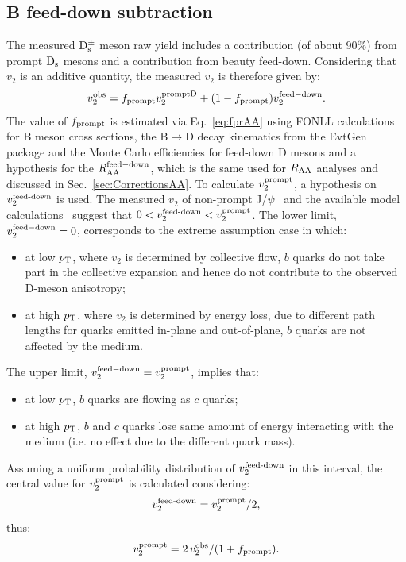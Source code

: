 \subsection{B feed-down subtraction}
\label{sec:FDv2}
The measured ${\rm D_s^{\pm}}$ meson raw yield includes a contribution (of about 90\%)
from prompt ${\rm D_s}$ mesons and a contribution from beauty feed-down.
Considering that $v_2$ is an additive quantity, the measured $v_2$ is therefore given by:
\begin{equation}
\label{eq:bfeed}
v_2^{\rm obs}=f_{\rm prompt} v_2^{\rm promptD} + (1-f_{\rm prompt})v_2^{\rm feed-down}.
\end{equation}
The value of $f_{\rm prompt}$ is estimated via Eq.~\ref{eq:fprAA} using FONLL calculations for B meson
cross sections, the B$\rightarrow$D decay kinematics from the EvtGen package and
the Monte Carlo efficiencies for feed-down D mesons and a
hypothesis for the $R_{\rm AA}^{\rm feed-down}$, which is the same used for
$R_{\rm AA}$ analyses and discussed in Sec.~\ref{sec:CorrectionsAA}.
To calculate $v_{\rm 2}^{\rm prompt}$, a hypothesis on 
$v_{\rm 2}^{\rm feed\textnormal{-}down}$ is used.
The measured $v_2$ of non-prompt J/$\psi$~\cite{Khachatryan:2016ypw} 
and the available model calculations~\cite{Aichelin:2012ww,Uphoff:2012gb,Greco:2007sz} 
suggest that $0<v_{\rm 2}^{\rm feed\textnormal{-}down}<v_{\rm 2}^{\rm prompt}$.
The lower limit, $v_2^{\rm feed-down}=0$, corresponds to the extreme assumption case in which:
\begin{itemize}
\item{at low $p_{\rm T}$, where $v_2$ is determined by collective flow, 
$b$ quarks do not take part in the collective expansion and hence do 
not contribute to the observed D-meson anisotropy;}
\item{at high $p_{\rm T}$, where $v_2$ is determined by 
energy loss, due to different path lengths for quarks emitted in-plane and out-of-plane,
$b$ quarks are not affected by the medium.}
\end{itemize}
The upper limit, $v_2^{\rm feed-down}=v_2^{\rm prompt}$, implies that:
\begin{itemize}
\item{at low $p_{\rm T}$, $b$ quarks are flowing as $c$ quarks;}
\item{at high $p_{\rm T}$, $b$ and $c$ quarks lose same amount of energy interacting with 
the medium (i.e. no effect due to the different quark mass).}
\end{itemize}
Assuming a uniform probability distribution of $v_{\rm 2}^{\rm feed\textnormal{-}down}$ in this interval,
the central value for $v_{\rm 2}^{\rm prompt}$ is calculated 
considering:
\begin{equation}
\label{eq:hypoFD}
v_{\rm 2}^{\rm feed\textnormal{-}down}=v_{\rm 2}^{\rm prompt}/2,
\end{equation}
thus:
\begin{equation}
\label{eq:finalv2}
v_{\rm 2}^{\rm prompt}= 2\,v_{\rm 2}^{\rm obs}/(1+f_{\rm prompt}).
\end{equation}

